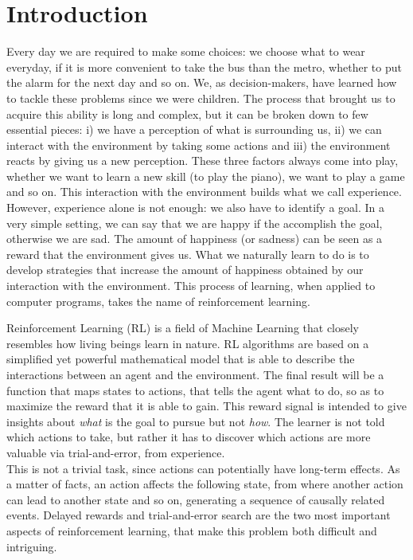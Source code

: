 \chapter{Introduction}
\label{ch:intro}
\setcounter{page}{1}


Every day we are required to make some choices:  we choose what to wear everyday, if it is more convenient to take the bus than the metro, whether to put the alarm for the next day and so on. We, as decision-makers, have learned how to tackle these problems since we were children. The process that brought us to acquire this ability is long and complex, but it can be broken down to few essential pieces: i) we have a perception of what is surrounding us, ii) we can interact with the environment by taking some actions and iii) the environment reacts by giving us a new perception. These three factors always come into play, whether we want to learn a new skill (\eg to play the piano), we want to play a game and so on. This interaction with the environment builds what we call experience. However, experience alone is not enough: we also have to identify a goal. In a very simple setting, we can say that we are happy if the accomplish the goal, otherwise we are sad. The amount of happiness (or sadness) can be seen as a reward that the environment gives us. What we naturally learn to do is to develop strategies that increase the amount of happiness obtained by our interaction with the environment. This process of learning, when applied to computer programs, takes the name of reinforcement learning.



Reinforcement Learning (RL) is a field of Machine Learning that closely resembles how living beings learn in nature. RL algorithms are based on a simplified yet powerful mathematical model that is able to describe the interactions between an agent and the environment.
%
The final result will be a function that maps states to actions, that tells the agent what to do, so as to maximize the reward that it is able to gain. This reward signal is intended to give insights about \textit{what} is the goal to pursue but not \textit{how}. The learner is not told which actions to take, but rather it has to discover which actions are more valuable via trial-and-error, from experience. \\
This is not a trivial task, since actions can potentially have long-term effects. As a matter of facts, an action affects the following state, from where another action can lead to another state and so on, generating a sequence of causally related events. Delayed rewards and trial-and-error search are the two most important aspects of reinforcement learning, that make this problem both difficult and intriguing.


